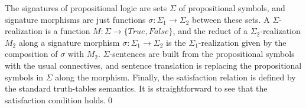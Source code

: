 \documentclass[10pt, a4paper]{isov2}
\begin{document}
\begin{definition}\label{Prop}
The signatures of propositional logic are sets $\Sigma$ of propositional symbols, and signature morphisms are just
functions $\sigma:{\Sigma_1}\to{\Sigma_2}$ between these sets.
A $\Sigma$-realization is a function $M : {\Sigma}\to{\{True, False\}}$, and the reduct of a
$\Sigma_2$-realization $M_2$ along a signature morphism $\sigma:{\Sigma_1}\to{\Sigma_2}$ is
the $\Sigma_1$-realization given by the composition of $\sigma$ with $M_2$. $\Sigma$-sentences are built from the
propositional symbols with the usual connectives, and sentence translation is replacing the propositional
symbols in $\Sigma$ along the morphism. Finally, the satisfaction relation is defined by the standard truth-tables
semantics. It is straightforward to see that the satisfaction condition holds.\quad\qed
\end{definition}
\end{document}
